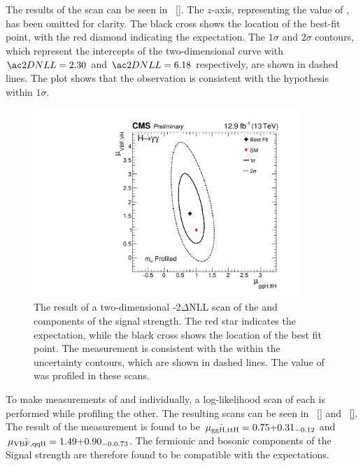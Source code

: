 The results of the scan can be seen in \Fig~\ref{}. The $z$-axis, representing the value of \DNLL, has been omitted for clarity.  The black cross shows the location of the best-fit point, with the red diamond indicating the \SM expectation. The $1\sigma$ and $2\sigma$ contours, which represent the intercepts of the two-dimensional \DNLL curve with $\DNLL=2.30$ and $\DNLL=6.18$ respectively, are shown in dashed lines. The plot shows that the observation is consistent with the \SM hypothesis within $1\sigma$.
\begin{figure}[ht!]
\centering
\includegraphics[width=0.9\textwidth]{statandresultsFigures/RVRFScanProfileMH.pdf} 
\caption{The result of a two-dimensional -2$\Delta$NLL scan of the \muF and \muV components of the signal strength. The red star indicates the \SM expectation, while the black cross shows the location of the best fit point. The measurement is consistent with the \SM within the uncertainty contours, which are shown in dashed lines. The value of \mH was profiled in these scans.}

\label{fig:statandresults:mu_per_rvrf}
\end{figure}

To make measurements of \muF and \muV individually, a log-likelihood scan of each is performed while profiling the other. The resulting scans can be seen in \Fig\s~\ref{} and ~\ref{}. The result of the measurement is found to be $\hat{\,\mu_{\text{ggH},\text{ttH}}}=0.75{+0.31}_{-0.12}$ and $\hat{\,\mu_{\text{VBF},\text{qqH}}}=1.49{+0.90}_{-0.0.73}$. The fermionic and bosonic components of the Signal strength are therefore found to be compatible with the \SM expectations. 

